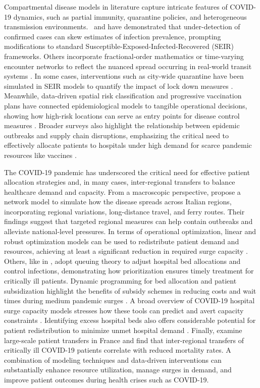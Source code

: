 \documentclass{article}
\begin{document}
Compartmental disease models in literature capture intricate features of COVID-19 dynamics, such as partial immunity, quarantine policies, and heterogeneous transmission environments.~\textcite{li2020modeling} and \textcite{crokidakis2020modeling} have demonstrated that under-detection of confirmed cases can skew estimates of infection prevalence, prompting modifications to standard Susceptible-Exposed-Infected-Recovered (SEIR) frameworks. Others incorporate fractional-order mathematics or time-varying encounter networks to reflect the nuanced spread occurring in real-world transit systems \parencite{koziol2020fractional, mo2021modeling}. In some cases, interventions such as city-wide quarantine have been simulated in SEIR models to quantify the impact of lock down measures \parencite{hou2020effectiveness, he2020seir}. Meanwhile, data-driven spatial risk classification and progressive vaccination plans have connected epidemiological models to tangible operational decisions, showing how high-risk locations can serve as entry points for disease control measures \parencite{hong2024data, bennouna2023covid}. Broader surveys also highlight the relationship between epidemic outbreaks and supply chain disruptions, emphasizing the critical need to effectively allocate patients to hospitals under high demand for scarce pandemic resources like vaccines \parencite{queiroz2022impacts, anastassopoulou2020data}.

The COVID-19 pandemic has underscored the critical need for effective patient allocation strategies and, in many cases, inter-regional transfers to balance healthcare demand and capacity. From a macroscopic perspective, \textcite{della2020network} propose a network model to simulate how the disease spreads across Italian regions, incorporating regional variations, long-distance travel, and ferry routes. Their findings suggest that targeted regional measures can help contain outbreaks and alleviate national-level pressures. In terms of operational optimization, linear and robust optimization models can be used to redistribute patient demand and resources, achieving at least a significant reduction in required surge capacity \parencite{parker2020optimal}. Others, like in \textcite{hu2020hospital}, adopt queuing theory to adjust hospital bed allocations and control infections, demonstrating how prioritization ensures timely treatment for critically ill patients. Dynamic programming for bed allocation and patient subsidization highlight the benefits of subsidy schemes in reducing costs and wait times during medium pandemic surges \parencite{ma2022cope}. A broad overview of COVID-19 hospital surge capacity models stresses how these tools can predict and avert capacity constraints \parencite{klein2022covid}. Identifying excess hospital beds also offers considerable potential for patient redistribution to minimize unmet hospital demand \parencite{soroush2022study}. Finally, \textcite{guillon2021inter} examine large-scale patient transfers in France and find that inter-regional transfers of critically ill COVID-19 patients correlate with reduced mortality rates. A combination of modeling techniques and data-driven interventions can substantially enhance resource utilization, manage surges in demand, and improve patient outcomes during health crises such as COVID-19.
\end{document}
